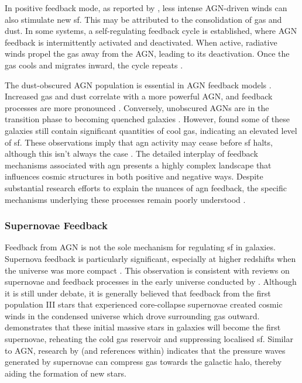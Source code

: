 In positive feedback mode, as reported by \cite{silk_unleashing_2013}, less intense AGN-driven winds can also stimulate new \gls{sf}. This may be attributed to the consolidation of gas and dust. In some systems, a self-regulating feedback cycle is established, where AGN feedback is intermittently activated and deactivated. When active, radiative winds propel the gas away from the AGN, leading to its deactivation. Once the gas cools and migrates inward, the cycle repeats \citep{heckman_coevolution_2014}.

The dust-obscured AGN population is essential in AGN feedback models \citep{gruppioni_modelling_2011, hickox_obscured_2018}. Increased gas and dust correlate with a more powerful AGN, and feedback processes are more pronounced \citep{hickox_obscured_2018}. Conversely, unobscured AGNs are in the transition phase to becoming quenched galaxies \citep{hopkins_cosmological_2008}. However, \cite{frias_castillo_at_2024} found some of these galaxies still contain significant quantities of cool gas, indicating an elevated level of \gls{sf}. These observations imply that \gls{agn} activity may cease before \gls{sf} halts, although this isn't always the case \citep{morganti_many_2017, cielo_agn_2018}. The detailed interplay of feedback mechanisms associated with \gls{agn} presents a highly complex landscape that influences cosmic structures in both positive and negative ways. Despite substantial research efforts to explain the nuances of \gls{agn} feedback, the specific mechanisms underlying these processes remain poorly understood \citep{fiore_agn_2017}.

\subsubsection{Supernovae Feedback}
Feedback from AGN is not the sole mechanism for regulating \gls{sf} in galaxies. Supernova feedback is particularly significant, especially at higher redshifts when the universe was more compact \citep{heckman_nature_1990, katsianis_evolution_2017}. This observation is consistent with reviews on supernovae and feedback processes in the early universe conducted by \cite{volonteri_assembly_2003, cayrel_first_2004, sokasian_cosmic_2004, klessen_first_2023}. Although it is still under debate, it is generally believed that feedback from the first population III stars that experienced core-collapse supernovae created cosmic winds in the condensed universe which drove surrounding gas outward. \cite{croton_many_2006} demonstrates that these initial massive stars in galaxies will become the first supernovae, reheating the cold gas reservoir and suppressing localised \gls{sf}. Similar to AGN, research by \cite{sokasian_cosmic_2004} (and references within) indicates that the pressure waves generated by supernovae can compress gas towards the galactic halo, thereby aiding the formation of new stars.

